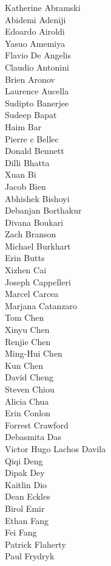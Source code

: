 Katherine Abramski\\
Abidemi Adeniji\\
Edoardo Airoldi\\
Yasuo Amemiya\\
Flavio De Angelis\\
Claudio Antonini\\
Brien Aronov\\
Laurence Aucella\\
Sudipto Banerjee\\
Sudeep Bapat\\
Haim Bar\\
Pierre c Bellec\\
Donald Bennett\\
Dilli Bhatta\\
Xuan Bi\\
Jacob Bien\\
Abhishek Bishoyi\\
Debanjan Borthakur\\
Divana Boukari\\
Zach Branson\\
Michael Burkhart\\
Erin Butts\\
Xizhen Cai\\
Joseph Cappelleri\\
Marcel Carcea\\
Marjana Catanzaro\\
Tom Chen\\
Xinyu Chen\\
Renjie Chen\\
Ming-Hui  Chen\\
Kun Chen\\
David Cheng\\
Steven Chiou\\
Alicia Chua\\
Erin Conlon\\
Forrest Crawford\\
Debasmita Das\\
Victor Hugo Lachos Davila\\
Qiqi  Deng\\
Dipak Dey\\
Kaitlin Dio\\
Dean Eckles\\
Birol Emir\\
Ethan Fang\\
Fei Fang\\
Patrick Flaherty\\
Paul Frydryk\\
